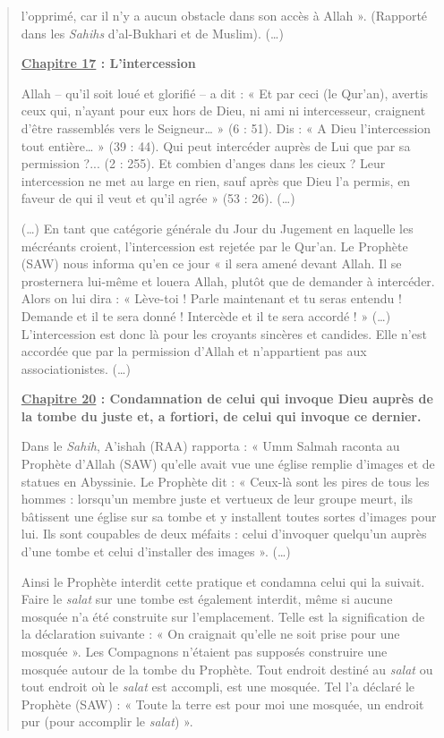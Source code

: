\begin{quote}
l'opprimé, car il n'y a aucun obstacle dans son accès à Allah ».
(Rapporté dans les \emph{Sahihs} d'al-Bukhari et de Muslim). (\ldots)

\textbf{\underline{Chapitre 17} : L'intercession}

Allah -- qu'il soit loué et glorifié -- a dit : « Et par ceci (le
Qur'an), avertis ceux qui, n'ayant pour eux hors de Dieu, ni ami ni
intercesseur, craignent d'être rassemblés vers le Seigneur\ldots{} » (6
: 51). Dis : « A Dieu l'intercession tout entière\ldots{} » (39 : 44).
Qui peut intercéder auprès de Lui que par sa permission ?... (2 : 255).
Et combien d'anges dans les cieux ? Leur intercession ne met au large en
rien, sauf après que Dieu l'a permis, en faveur de qui il veut et qu'il
agrée » (53 : 26). (\ldots)

(\ldots) En tant que catégorie générale du Jour du Jugement en laquelle
les mécréants croient, l'intercession est rejetée par le Qur'an. Le
Prophète (SAW) nous informa qu'en ce jour « il sera amené devant Allah.
Il se prosternera lui-même et louera Allah, plutôt que de demander à
intercéder. Alors on lui dira : « Lève-toi ! Parle maintenant et tu
seras entendu ! Demande et il te sera donné ! Intercède et il te sera
accordé ! » (\ldots) L'intercession est donc là pour les croyants
sincères et candides. Elle n'est accordée que par la permission d'Allah
et n'appartient pas aux associationistes. (\ldots)

\textbf{\underline{Chapitre 20} : Condamnation de celui qui invoque Dieu
auprès de la tombe du juste et, a fortiori, de celui qui invoque ce
dernier.}

Dans le \emph{Sahih}, A'ishah (RAA) rapporta : « Umm Salmah raconta au
Prophète d'Allah (SAW) qu'elle avait vue une église remplie d'images et
de statues en Abyssinie. Le Prophète dit : « Ceux-là sont les pires de
tous les hommes : lorsqu'un membre juste et vertueux de leur groupe
meurt, ils bâtissent une église sur sa tombe et y installent toutes
sortes d'images pour lui. Ils sont coupables de deux méfaits : celui
d'invoquer quelqu'un auprès d'une tombe et celui d'installer des images
». (\ldots)

Ainsi le Prophète interdit cette pratique et condamna celui qui la
suivait. Faire le \emph{salat} sur une tombe est également interdit,
même si aucune mosquée n'a été construite sur l'emplacement. Telle est
la signification de la déclaration suivante : « On craignait qu'elle ne
soit prise pour une mosquée ». Les Compagnons n'étaient pas supposés
construire une mosquée autour de la tombe du Prophète. Tout endroit
destiné au \emph{salat} ou tout endroit où le \emph{salat} est accompli,
est une mosquée. Tel l'a déclaré le Prophète (SAW) : « Toute la terre
est pour moi une mosquée, un endroit pur (pour accomplir le
\emph{salat}) ».


\end{quote}
